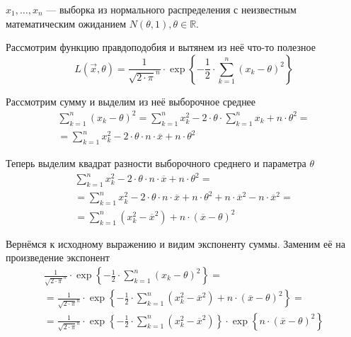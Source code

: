 \begin{example}
    $x_1, \dots, x_n$ --- выборка из нормального распределения с неизвестным
    математическим ожиданием $N\left( \theta, 1 \right), \theta \in \mathbb{R}$.

    Рассмотрим функцию правдоподобия и вытянем из неё что-то полезное
    $$L\left( \vec{x}, \theta \right)
        = \frac{1}{\sqrt{2 \cdot \pi}^n}
            \cdot \exp{\left\{ -\frac{1}{2}
                \cdot \sum_{k=1}^n \left( x_k - \theta \right)^2 \right\}}$$

    Рассмотрим сумму и выделим из неё выборочное среднее
    \begin{align*}
        \sum_{k=1}^n \left( x_k - \theta \right)^2
        = \sum_{k=1}^n x_k^2 - 2 \cdot \theta \cdot \sum_{k=1}^n x_k
            + n \cdot \theta^2 = \\
        = \sum_{k=1}^n x_k^2 - 2 \cdot \theta \cdot n \cdot \overline{x}
            + n \cdot \theta^2
    \end{align*}

    Теперь выделим квадрат разности выборочного среднего и параметра $\theta$
    \begin{align*}
        \sum_{k=1}^n x_k^2 - 2 \cdot \theta \cdot n \cdot \overline{x}
            + n \cdot \theta^2 = \\
        = \sum_{k=1}^n x_k^2 - 2 \cdot \theta \cdot n \cdot \overline{x}
            + n \cdot \theta^2 + n \cdot \overline{x}^2
            - n \cdot \overline{x}^2 = \\
        = \sum_{k=1}^n \left( x_k^2 - \overline{x}^2 \right)
            + n \cdot \left( \overline{x} - \theta \right)^2
    \end{align*}

    Вернёмся к исходному выражению и видим экспоненту суммы.
    Заменим её на произведение экспонент
    \begin{align*}
        \frac{1}{\sqrt{2 \cdot \pi}^n} \cdot \exp{\left\{ -\frac{1}{2}
            \cdot \sum_{k=1}^n \left( x_k - \theta \right)^2 \right\}} = \\
            = \frac{1}{\sqrt{2 \cdot \pi}^n} \cdot \exp{\left\{ -\frac{1}{2}
                \cdot \sum_{k=1}^n \left( x_k^2 - \overline{x}^2 \right)
                    + n \cdot \left( \overline{x} - \theta \right)^2
                    \right\}} = \\
            = \frac{1}{\sqrt{2 \cdot \pi}^n}
                \cdot \exp{\left\{ -\frac{1}{2}
                    \cdot \sum_{k=1}^n \left( x_k^2 - \overline{x}^2 \right)
                        \right\}}
                \cdot \exp{\left\{ n \cdot \left( \overline{x}
                    - \theta \right)^2 \right\}}
    \end{align*}


\end{example}

